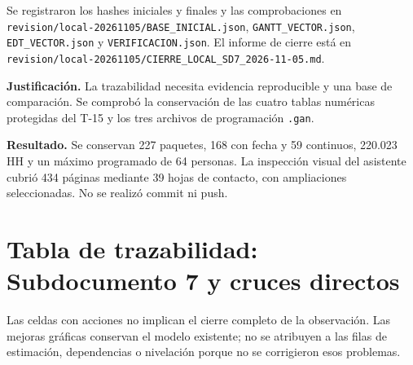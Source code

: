 \documentclass[11pt,letterpaper]{article}
\newcommand{\ruta}[1]{\nolinkurl{#1}}
\begin{document}
Se registraron los hashes iniciales y finales y las comprobaciones en
\ruta{revision/local-20261105/BASE_INICIAL.json},
\ruta{GANTT_VECTOR.json}, \ruta{EDT_VECTOR.json} y \ruta{VERIFICACION.json}.
El informe de cierre está en
\ruta{revision/local-20261105/CIERRE_LOCAL_SD7_2026-11-05.md}.

\textbf{Justificación.} La trazabilidad necesita evidencia reproducible y una
base de comparación. Se comprobó la conservación de las cuatro tablas numéricas
protegidas del T-15 y los tres archivos de programación \ruta{.gan}.

\textbf{Resultado.} Se conservan 227 paquetes, 168 con fecha y 59 continuos,
220.023 HH y un máximo programado de 64 personas. La inspección visual del
asistente cubrió 434 páginas mediante 39 hojas de contacto, con ampliaciones
seleccionadas. No se realizó commit ni push.

\section{Tabla de trazabilidad: Subdocumento 7 y cruces directos}

Las celdas con acciones no implican el cierre completo de la observación. Las
mejoras gráficas conservan el modelo existente; no se atribuyen a las filas de
estimación, dependencias o nivelación porque no se corrigieron esos problemas.
\end{document}
